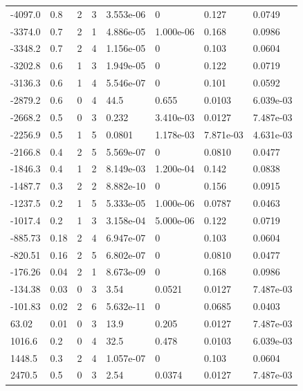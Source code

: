 \documentclass[preview]{standalone}
\begin{document}
{{\begin{tabular}{L{1.2cm}C{1.2cm} C{0.3cm}C{0.5cm} C{1.4cm}C{1.4cm} C{1.4cm}C{1.4cm}}
  -4097.0  &   0.8  & 2     &  3 &  3.553e-06  & 0  & 0.127 &  0.0749   \\ 
  -3374.0  &   0.7  & 2     &  1 &  4.886e-05  & 1.000e-06  & 0.168 &  0.0986   \\ 
  -3348.2  &   0.7  & 2     &  4 &  1.156e-05  & 0  & 0.103 &  0.0604   \\ 
  -3202.8  &   0.6  & 1     &  3 &  1.949e-05  & 0  & 0.122 &  0.0719   \\ 
  -3136.3  &   0.6  & 1     &  4 &  5.546e-07  & 0  & 0.101 &  0.0592   \\ 
  -2879.2  &   0.6  & 0     &  4 &  44.5  & 0.655  & 0.0103 &  6.039e-03   \\ 
  -2668.2  &   0.5  & 0     &  3 &  0.232  & 3.410e-03  & 0.0127 &  7.487e-03   \\ 
  -2256.9  &   0.5  & 1     &  5 &  0.0801  & 1.178e-03  & 7.871e-03 &  4.631e-03   \\ 
  -2166.8  &   0.4  & 2     &  5 &  5.569e-07  & 0  & 0.0810 &  0.0477   \\ 
  -1846.3  &   0.4  & 1     &  2 &  8.149e-03  & 1.200e-04  & 0.142 &  0.0838   \\ 
  -1487.7  &   0.3  & 2     &  2 &  8.882e-10  & 0  & 0.156 &  0.0915   \\ 
  -1237.5  &   0.2  & 1     &  5 &  5.333e-05  & 1.000e-06  & 0.0787 &  0.0463   \\ 
  -1017.4  &   0.2  & 1     &  3 &  3.158e-04  & 5.000e-06  & 0.122 &  0.0719   \\ 
  -885.73  &  0.18  & 2     &  4 &  6.947e-07  & 0  & 0.103 &  0.0604   \\ 
  -820.51  &  0.16  & 2     &  5 &  6.802e-07  & 0  & 0.0810 &  0.0477   \\ 
  -176.26  &  0.04  & 2     &  1 &  8.673e-09  & 0  & 0.168 &  0.0986   \\ 
  -134.38  &  0.03  & 0     &  3 &  3.54  & 0.0521  & 0.0127 &  7.487e-03   \\ 
  -101.83  &  0.02  & 2     &  6 &  5.632e-11  & 0  & 0.0685 &  0.0403   \\ 
  63.02  &  0.01  & 0     &  3 &  13.9  & 0.205  & 0.0127 &  7.487e-03   \\ 
  1016.6  &   0.2  & 0     &  4 &  32.5  & 0.478  & 0.0103 &  6.039e-03   \\ 
  1448.5  &   0.3  & 2     &  4 &  1.057e-07  & 0  & 0.103 &  0.0604   \\ 
  2470.5  &   0.5  & 0     &  3 &  2.54  & 0.0374  & 0.0127 &  7.487e-03   \\ 

\end{tabular}}}
\end{document}
